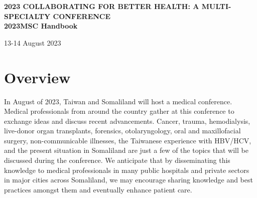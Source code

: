 \documentclass{article}
\begin{document}

\begin{titlepage}

\hspace*{-0.7cm}%
\begin{tikzpicture} %


\hspace{1.4cm}
%

\end{tikzpicture}
    \vspace{4cm}
    
\centering
    {\Huge\bfseries %
    2023 COLLABORATING FOR BETTER HEALTH:
A MULTI-SPECIALTY CONFERENCE \\
2023MSC Handbook\par}
    \vspace{1.5cm}
    {\Large 13-14 August 2023\par}


\vspace{2.5cm}




\end{titlepage}



\clearpage

\section*{Overview}
In August of 2023, Taiwan and Somaliland will host a medical conference. Medical professionals from around the country gather at this conference to exchange ideas and discuss recent advancements. Cancer, trauma, hemodialysis, live-donor organ transplants, forensics, otolaryngology, oral and maxillofacial surgery, non-communicable illnesses, the Taiwanese experience with HBV/HCV, and the present situation in Somaliland are just a few of the topics that will be discussed during the conference. We anticipate that by disseminating this knowledge to medical professionals in many public hospitals and private sectors in major cities across Somaliland, we may encourage sharing knowledge and best practices amongst them and eventually enhance patient care.
\end{document}

